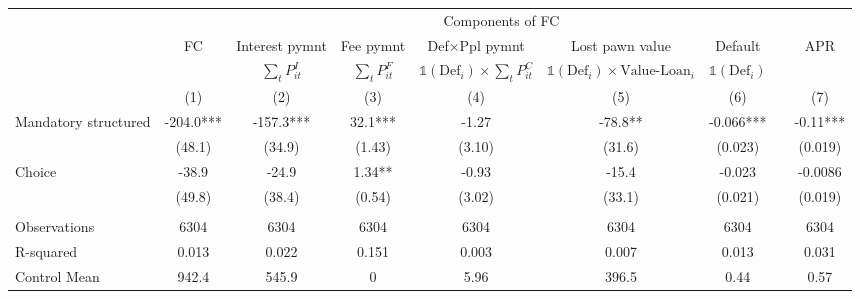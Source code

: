 \begin{tabular}{lcccccccc}
\toprule
      &       & \multicolumn{5}{c}{Components of FC}  &       &  \\
\cmidrule{3-7}      & FC    & Interest pymnt & Fee pymnt & Def$\times$Ppl pymnt & Lost pawn value & Default &       & APR \\
\cmidrule{2-2}\cmidrule{9-9}      &       & $\sum_t P^I_{it}$ & $\sum_t P^F_{it}$ & $\mathds{1}(\text{Def}_i)\times\sum_t P^C_{it}$ & $\mathds{1}(\text{Def}_i)\times \text{Value-Loan}_i$ & $\mathds{1}(\text{Def}_i)$ &       &  \\
\midrule
      & (1)   & (2)   & (3)   & (4)   & (5)   & (6)   &       & (7) \\
\midrule
\midrule
Mandatory structured & -204.0*** & -157.3*** & 32.1*** & -1.27 & -78.8** & -0.066*** &       & -0.11*** \\
      & (48.1) & (34.9) & (1.43) & (3.10) & (31.6) & (0.023) &       & (0.019) \\
Choice  & -38.9 & -24.9 & 1.34** & -0.93 & -15.4 & -0.023 &       & -0.0086 \\
      & (49.8) & (38.4) & (0.54) & (3.02) & (33.1) & (0.021) &       & (0.019) \\
      &       &       &       &       &       &       &       &  \\
\midrule
Observations & 6304  & 6304  & 6304  & 6304  & 6304  & 6304  &       & 6304 \\
R-squared & 0.013 & 0.022 & 0.151 & 0.003 & 0.007 & 0.013 &       & 0.031 \\
Control Mean & 942.4 & 545.9 & 0     & 5.96  & 396.5 & 0.44  &       & 0.57 \\
\bottomrule
\bottomrule
\end{tabular}%
